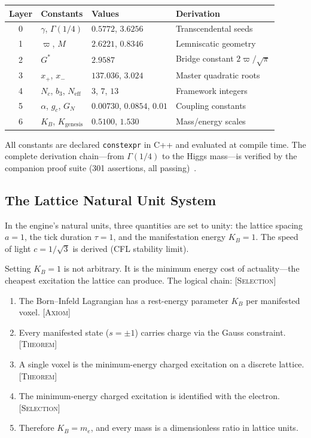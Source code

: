 \documentclass[11pt,a4paper]{article}
\newcommand{\Gstar}{{G^{*}}}
\newcommand{\vpi}{\varpi}
\newcommand{\Nc}{N_c}
\newcommand{\Neff}{N_{\mathrm{eff}}}
\newcommand{\KB}{K_B}
\newcommand{\etag}[1]{{\normalfont\textsc{\footnotesize [#1]}}}
\theoremstyle{compact}
\begin{document}
\begin{center}
\small
\begin{tabular}{clll}
\toprule
\textbf{Layer} & \textbf{Constants} & \textbf{Values} & \textbf{Derivation} \\
\midrule
0 & $\gamma$, $\Gamma(1/4)$ & $0.5772$, $3.6256$ & Transcendental seeds \\
1 & $\vpi$, $M$ & $2.6221$, $0.8346$ & Lemniscatic geometry \\
2 & $\Gstar$ & $2.9587$ & Bridge constant $2\vpi/\sqrt{\pi}$ \\
3 & $x_+$, $x_-$ & $137.036$, $3.024$ & Master quadratic roots \\
4 & $\Nc$, $b_3$, $\Neff$ & $3$, $7$, $13$ & Framework integers \\
5 & $\alpha$, $g_c$, $G_N$ & $0.00730$, $0.0854$, $0.01$ & Coupling constants \\
6 & $\KB$, $K_{\mathrm{genesis}}$ & $0.5100$, $1.530$ & Mass/energy scales \\
\bottomrule
\end{tabular}
\end{center}

All constants are declared \texttt{constexpr} in C++ and evaluated at compile time. The complete derivation chain---from $\Gamma(1/4)$ to the Higgs mass---is verified by the companion proof suite (301 assertions, all passing)~\cite{chain}.

\subsection*{The Lattice Natural Unit System}

In the engine's natural units, three quantities are set to unity: the lattice spacing $a = 1$, the tick duration $\tau = 1$, and the manifestation energy $\KB = 1$. The speed of light $c = 1/\sqrt{3}$ is derived (CFL stability limit).

Setting $\KB = 1$ is not arbitrary. It is the minimum energy cost of actuality---the cheapest excitation the lattice can produce. The logical chain: \etag{Selection}
\begin{enumerate}[nosep]
\item The Born--Infeld Lagrangian has a rest-energy parameter $\KB$ per manifested voxel. \etag{Axiom}
\item Every manifested state ($s = \pm 1$) carries charge via the Gauss constraint. \etag{Theorem}
\item A single voxel is the minimum-energy charged excitation on a discrete lattice. \etag{Theorem}
\item The minimum-energy charged excitation is identified with the electron. \etag{Selection}
\item Therefore $\KB = m_e$, and every mass is a dimensionless ratio in lattice units.
\end{enumerate}
\end{document}
